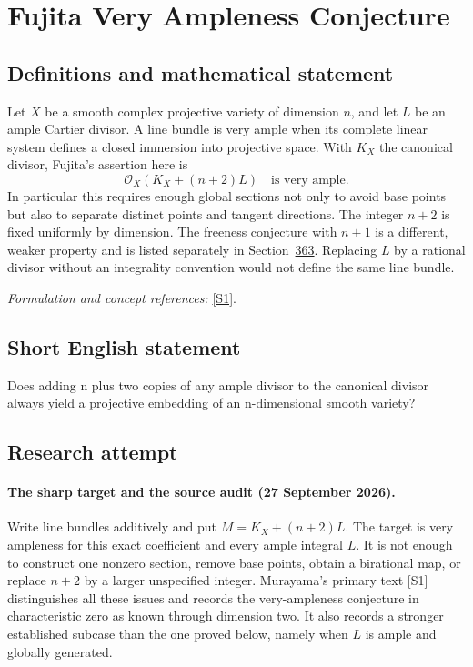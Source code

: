 \documentclass[11pt]{article}
\begin{document}
\section*{\texorpdfstring{Fujita Very Ampleness Conjecture}{Fujita Very Ampleness Conjecture}}\label{statement}
\subsection{Definitions and mathematical statement}
Let $X$ be a smooth complex projective variety of dimension $n$, and let $L$ be an ample Cartier divisor. A line bundle is very ample when its complete linear system defines a closed immersion into projective space. With $K_X$ the canonical divisor, Fujita's assertion here is
\[
 \mathcal O_X(K_X+(n+2)L)\quad\text{is very ample}.
\]
In particular this requires enough global sections not only to avoid base points but also to separate distinct points and tangent directions. The integer $n+2$ is fixed uniformly by dimension. The freeness conjecture with $n+1$ is a different, weaker property and is listed separately in Section~\href{https://mehmetmars7.github.io/Erdosproblems-llm-hunter/problem.html?type=open_problems&id=problem.fujita-freeness-conjecture}{363}. Replacing $L$ by a rational divisor without an integrality convention would not define the same line bundle.
\par\smallskip\textit{Formulation and concept references:} \href{https://arxiv.org/abs/2408.06530}{[S1]}.

\subsection{Short English statement}
Does adding n plus two copies of any ample divisor to the canonical divisor always yield a projective embedding of an n-dimensional smooth variety?
\subsection{Research attempt}

\paragraph{The sharp target and the source audit (27 September 2026).}
Write line bundles additively and put $M=K_X+(n+2)L$. The target is
very ampleness for this exact coefficient and every ample integral $L$.
It is not enough to construct one nonzero section, remove base points,
obtain a birational map, or replace $n+2$ by a larger unspecified integer.
Murayama's primary text [S1] distinguishes all these issues and records
the very-ampleness conjecture in characteristic zero as known through
dimension two. It also records a stronger established subcase than the
one proved below, namely when $L$ is ample and globally generated.
\end{document}
